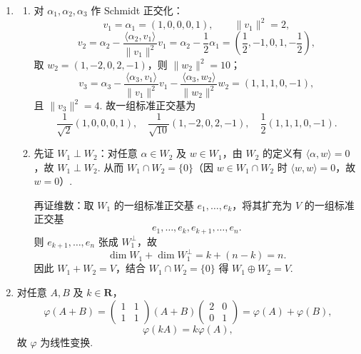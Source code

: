 \begin{enumerate}
    \item
    \begin{enumerate}
        \item 对 $\alpha_1,\alpha_2,\alpha_3$ 作 Schmidt 正交化：
        \[
            v_1=\alpha_1=(1,0,0,0,1),\qquad \|v_1\|^2=2,
        \]
        \[
            v_2=\alpha_2-\frac{\langle\alpha_2,v_1\rangle}{\|v_1\|^2}v_1
            =\alpha_2-\frac12\alpha_1
            =\left(\frac12,-1,0,1,-\frac12\right),
        \]
        取 $w_2=(1,-2,0,2,-1)$，则 $\|w_2\|^2=10$；
        \[
            v_3=\alpha_3-\frac{\langle\alpha_3,v_1\rangle}{\|v_1\|^2}v_1
            -\frac{\langle\alpha_3,w_2\rangle}{\|w_2\|^2}w_2
            =(1,1,1,0,-1),
        \]
        且 $\|v_3\|^2=4$. 故一组标准正交基为
        \[
            \frac{1}{\sqrt2}(1,0,0,0,1),\quad
            \frac{1}{\sqrt{10}}(1,-2,0,2,-1),\quad
            \frac12(1,1,1,0,-1).
        \]

        \item 先证 $W_1\perp W_2$：对任意 $\alpha\in W_2$ 及 $w\in W_1$，由 $W_2$ 的定义有 $\langle\alpha,w\rangle=0$，故 $W_1\perp W_2$. 从而 $W_1\cap W_2=\{0\}$（因 $w\in W_1\cap W_2$ 时 $\langle w,w\rangle=0$，故 $w=0$）.

        再证维数：取 $W_1$ 的一组标准正交基 $e_1,\ldots,e_k$，将其扩充为 $V$ 的一组标准正交基
        \[
            e_1,\ldots,e_k,e_{k+1},\ldots,e_n.
        \]
        则 $e_{k+1},\ldots,e_n$ 张成 $W_1^{\perp}$，故
        \[
            \dim W_1+\dim W_1^{\perp}=k+(n-k)=n.
        \]
        因此 $W_1+W_2=V$，结合 $W_1\cap W_2=\{0\}$ 得 $W_1\oplus W_2=V$.
    \end{enumerate}

    \item 对任意 $A,B$ 及 $k\in\mathbf{R}$，
    \[
        \varphi(A+B)=\begin{pmatrix}1&1\\1&1\end{pmatrix}(A+B)\begin{pmatrix}2&0\\0&1\end{pmatrix}
        =\varphi(A)+\varphi(B),
    \]
    \[
        \varphi(kA)=k\varphi(A),
    \]
    故 $\varphi$ 为线性变换.


\end{enumerate}
